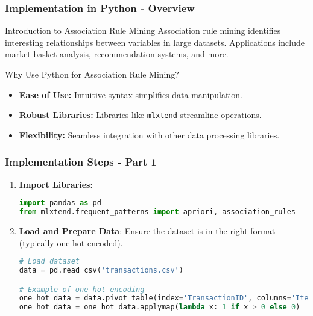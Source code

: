 \documentclass[aspectratio=169]{beamer}
\begin{document}
\begin{frame}
    \frametitle{Implementation in Python - Overview}
    \begin{block}{Introduction to Association Rule Mining}
        Association rule mining identifies interesting relationships between variables in large datasets. 
        Applications include market basket analysis, recommendation systems, and more.
    \end{block}

    \begin{block}{Why Use Python for Association Rule Mining?}
        \begin{itemize}
            \item \textbf{Ease of Use:} Intuitive syntax simplifies data manipulation.
            \item \textbf{Robust Libraries:} Libraries like \texttt{mlxtend} streamline operations.
            \item \textbf{Flexibility:} Seamless integration with other data processing libraries.
        \end{itemize}
    \end{block}
\end{frame}

\begin{frame}[fragile]
    \frametitle{Implementation Steps - Part 1}
    
    \begin{enumerate}
        \item \textbf{Import Libraries}:
        \begin{lstlisting}[language=Python]
import pandas as pd
from mlxtend.frequent_patterns import apriori, association_rules
        \end{lstlisting}
        
        \item \textbf{Load and Prepare Data}:
        Ensure the dataset is in the right format (typically one-hot encoded).
        \begin{lstlisting}[language=Python]
# Load dataset
data = pd.read_csv('transactions.csv')

# Example of one-hot encoding
one_hot_data = data.pivot_table(index='TransactionID', columns='Item', aggfunc='length').fillna(0)
one_hot_data = one_hot_data.applymap(lambda x: 1 if x > 0 else 0)
        \end{lstlisting}
    \end{enumerate}
\end{frame}
\end{document}

